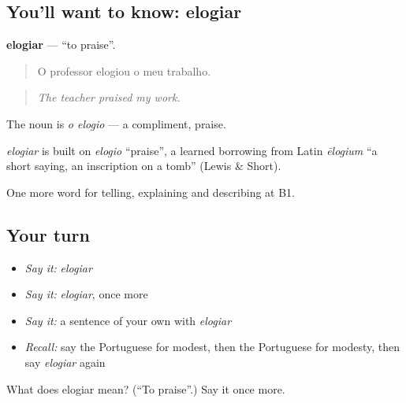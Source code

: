 \subsection*{You'll want to know: elogiar}
\textbf{elogiar} — \textquotedblleft{}to praise\textquotedblright{}.

\begin{quote}
O professor elogiou o meu trabalho.
\end{quote}

\begin{quote}
\emph{The teacher praised my work.}
\end{quote}

The noun is \emph{o elogio} — a compliment, praise.

\begin{cousinweb}
\emph{elogiar} is built on \emph{elogio} \textquotedblleft{}praise\textquotedblright{}, a learned borrowing from Latin \emph{ēlogium} \textquotedblleft{}a short saying, an inscription on a tomb\textquotedblright{} (Lewis \& Short).
\end{cousinweb}

\begin{grammarlens}[title={What you've built}]
One more word for telling, explaining and describing at B1.
\end{grammarlens}

\subsection*{Your turn}
\begin{itemize}
\raggedright
  \item \emph{Say it:} \emph{elogiar}
  \item \emph{Say it:} \emph{elogiar}, once more
  \item \emph{Say it:} a sentence of your own with \emph{elogiar}
  \item \emph{Recall:} say the Portuguese for modest, then the Portuguese for modesty, then say \emph{elogiar} again
\end{itemize}

\begin{tcolorbox}[breakable,colback=teal!4,colframe=teal!35!black,title={Before you move on}]
What does elogiar mean? (\textquotedblleft{}To praise\textquotedblright{}.) Say it once more.
\end{tcolorbox}
